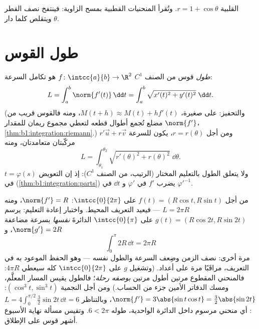 \begin{omfigure}

{\small القلبية $r = 1 + \cos\theta$. وتُقرأ المنحنيات القطبية
بمسح الزاوية: فينتفخ نصف القطر ويتقلص كلما دار $\theta$.}
\end{omfigure}

\section{طول القوس}

\begin{definition}\label{def:b1:curves:arclength}
\emph{طول} قوس من الصنف $C^1$ $f \colon
\intcc{a}{b} \to \R^2$ هو تكامل السرعة:
\[
L = \int_a^b \norm{f'(t)}\,\dd t
= \int_a^b \sqrt{x'(t)^2 + y'(t)^2}\;\dd t .
\]
(والتحفيز: على  صغيرة، $M(t + h) \approx M(t) + h
f'(t)$، ومنه فالقوس قريب من مضلع تُجمع أطوال قطعه
لتعطي مجموع ريمان للمقدار $\norm{f'}$،
\cref{thm:b1:integration:riemann}.) ومن أجل  $r =
r(\theta)$، يكون للسرعة $r'\vec u + r\vec v$ مركّبتان
متعامدتان، ومنه
\[
L = \int_{\theta_1}^{\theta_2}
\sqrt{r'(\theta)^2 + r(\theta)^2}\;\dd\theta .
\]
ولا يتعلق الطول بالتعليم المختار (الرتيب، من الصنف
$C^1$): إذ إن التعويض $t = \varphi(s)$ في
 (\cref{thm:b1:integration:parts}) يضرب $f'$ في
$\varphi'$ و $\dd t$ في $\varphi'^{-1}$.
\end{definition}

\begin{example}\label{ex:b1:curves:circlelength}
من أجل $f(t) = (R\cos t, R\sin t)$ على $\intcc{0}{2\pi}$: $\norm{f'} =
R$، ومنه $L = 2\pi R$ --- فيعيد التعريف المحيط.
واختبار إعادة التعليم: يرسم  $g(t) = (R\cos 2t, R\sin 2t)$ على
$\intcc{0}{\pi}$ الدائرةَ \emph{نفسها} بسرعة مضاعفة
$\norm{g'} = 2R$، و
\[
\int_0^{\pi} 2R\,\dd t = 2\pi R
\]
مرة أخرى: نصف الزمن وضِعف السرعة والطول نفسه --- وهو
الحفظ الموعود به في التعريف، مراقَبًا مرة على أعداد.
(وتشغيل $g$ على $\intcc{0}{2\pi}$ كله سيعطي $4\pi R$:
فالمنحني المقطوع مرتين أطول مرتين \emph{بوصفه رحلة}؛
فالطول يقيس المسار المعلَّم، ومسك الدفاتر الأمين
 جزء من الحساب.)
ومن أجل النجمية $(\cos^3t, \sin^3t)$: $\norm{f'} = 3\abs{\sin
t\cos t} = \tfrac32\abs{\sin 2t}$، وبالتناظر $L = 4\int_0^{\pi/2}
\tfrac32\sin 2t\,\dd t = 6$: أي منحني مرسوم داخل الدائرة الواحدية،
طوله $6 < 2\pi$. وتقيس مسألة نهاية الأسبوع أشهر
قوس على الإطلاق.
\end{example}


